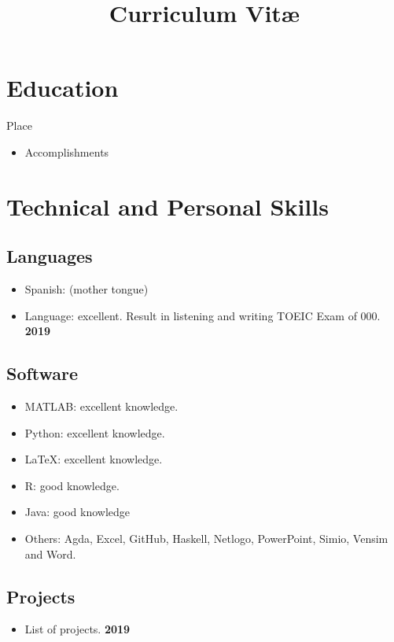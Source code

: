 \documentclass[11pt,a4paper,sans]{moderncv}
\title{Curriculum Vit\ae{}}
\begin{document}
\makecvtitle

\section{Education}
 {Place}{} {\vspace{3pt}
  \begin{itemize}
    \item Accomplishments
  \end{itemize}
}

\vspace{6pt}


\vspace{6pt}

\section{Technical and Personal Skills}
 \subsection{Languages}
 \begin{itemize}
   \item Spanish: (mother tongue)
   \item Language: excellent. Result in listening and writing TOEIC Exam of 000.
         \hfill \textbf{2019}
 \end{itemize}

 \subsection{Software}
 \begin{itemize}
   \item MATLAB: excellent knowledge.
   \item Python: excellent knowledge.
   \item \LaTeX: excellent knowledge.
   \item R: good knowledge.
   \item Java: good knowledge
   \item Others: Agda, Excel, GitHub, Haskell, Netlogo, PowerPoint, Simio,
         Vensim and Word.
 \end{itemize}

 \subsection{Projects}
 \begin{itemize}
   \item List of projects. \hfill \textbf{2019}
  \end{itemize}
\end{document}

